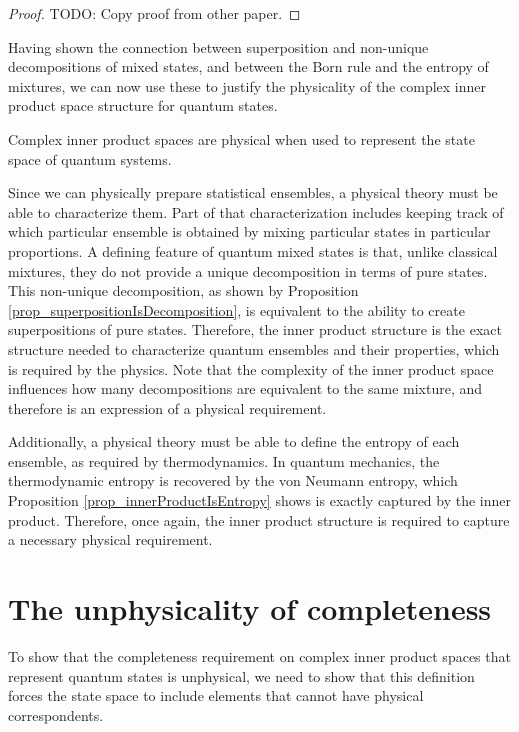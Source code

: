 \documentclass[10pt,twocolumn, nofootinbib]{revtex4-2}
\begin{document}
\begin{proof}
TODO: Copy proof from other paper.
\end{proof}

Having shown the connection between superposition and non-unique decompositions of mixed states, and between the Born rule and the entropy of mixtures, we can now use these to justify the physicality of the complex inner product space structure for quantum states.
\begin{prop}
Complex inner product spaces are physical when used to represent the state space of quantum systems.
\end{prop}
\begin{justification}
Since we can physically prepare statistical ensembles, a physical theory must be able to characterize them. Part of that characterization includes keeping track of which particular ensemble is obtained by mixing particular states in particular proportions. A defining feature of quantum mixed states is that, unlike classical mixtures, they do not provide a unique decomposition in terms of pure states. This non-unique decomposition, as shown by Proposition \ref{prop_superpositionIsDecomposition}, is equivalent to the ability to create superpositions of pure states. Therefore, the inner product structure is the exact structure needed to characterize quantum ensembles and their properties, which is required by the physics. Note that the complexity of the inner product space influences how many decompositions are equivalent to the same mixture, and therefore is an expression of a physical requirement.

Additionally, a physical theory must be able to define the entropy of each ensemble, as required by thermodynamics. In quantum mechanics, the thermodynamic entropy is recovered by the von Neumann entropy, which Proposition \ref{prop_innerProductIsEntropy} shows is exactly captured by the inner product. Therefore, once again, the inner product structure is required to capture a necessary physical requirement.
\end{justification}

\section{The unphysicality of completeness}

To show that the completeness requirement on complex inner product spaces that represent quantum states is unphysical, we need to show that this definition forces the state space to include elements that cannot have physical correspondents.
\end{document}
